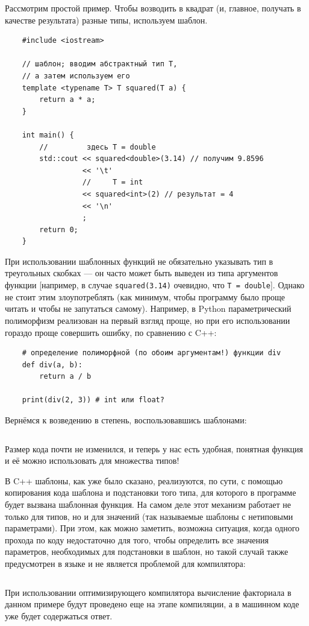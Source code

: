 \documentclass{book}
\begin{document}
Рассмотрим простой пример.  Чтобы возводить в квадрат (и, главное, получать в качестве результата)
разные типы, используем шаблон.
\begin{verbatim}
    #include <iostream>

    // шаблон; вводим абстрактный тип T,
    // а затем используем его
    template <typename T> T squared(T a) {
        return a * a;
    }

    int main() {
        //         здесь T = double
        std::cout << squared<double>(3.14) // получим 9.8596
                  << '\t'
                  //     T = int
                  << squared<int>(2) // результат = 4
                  << '\n'
                  ;
        return 0;
    }
\end{verbatim}
При использовании шаблонных функций не обязательно указывать тип в треугольных скобках --- он часто
может быть выведен из типа аргументов функции [например, в случае \texttt{squared(3.14)}
очевидно, что \texttt{T = double}]. Однако не стоит этим злоупотреблять (как минимум,
чтобы программу было проще читать и чтобы не запутаться самому).  Например, в Python
параметрический полиморфизм реализован на первый взгляд проще, но при его использовании гораздо
проще совершить ошибку, по сравнению с C++:
\begin{verbatim}
    # определение полиморфной (по обоим аргументам!) функции div
    def div(a, b):
        return a / b

    print(div(2, 3)) # int или float?
\end{verbatim}

Вернёмся к возведению в степень, воспользовавшись шаблонами:
\inputminted{cpp}{pow.cpp}
Размер кода почти не изменился, и теперь у нас есть удобная, понятная функция и её можно
использовать для множества типов!

В C++ шаблоны, как уже было сказано, реализуются, по сути, с помощью копирования кода шаблона и
подстановки того типа, для которого в программе будет вызвана шаблонная функция. На самом деле этот
механизм работает не только для типов, но и для значений (так называемые шаблоны с нетиповыми
параметрами).  При этом, как можно заметить, возможна ситуация, когда одного прохода по коду
недостаточно для того, чтобы определить все значения параметров, необходимых для подстановки в
шаблон, но такой случай также предусмотрен в языке и не является проблемой для компилятора:
\inputminted{cpp}{fac-template.cpp}
При использовании оптимизирующего компилятора вычисление факториала в данном примере будут
проведено еще на этапе компиляции, а в машинном коде уже будет содержаться ответ.
\end{document}
